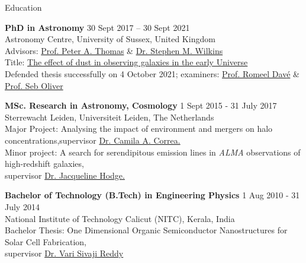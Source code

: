 \documentclass[a4paper,10pt]{resume} %
\begin{document}
\begin{rSection}{Education}

{\bf PhD in Astronomy} \hfill {30 Sept 2017 -- 30 Sept 2021}
\\ 
Astronomy Centre, University of Sussex, United Kingdom
\\
Advisors: \href{https://profiles.sussex.ac.uk/p2672-peter-thomas/about}{Prof. Peter A. Thomas} \& \href{http://stephenwilkins.co.uk/}{Dr. Stephen M. Wilkins}\\
Title: \href{https://sro.sussex.ac.uk/id/eprint/103266/}{The effect of dust in observing galaxies in the early Universe}\\
Defended thesis successfully on 4 October 2021; examiners: \href{https://romeeld.wixsite.com/romeel}{Prof. Romeel Dav{\'e}} \& \href{https://profiles.sussex.ac.uk/p91548-seb-oliver}{Prof. Seb Oliver}

{\bf MSc. Research in Astronomy, Cosmology} \hfill {1 Sept 2015 - 31 July 2017}
\\ 
Sterrewacht Leiden, Universiteit Leiden, The Netherlands\\
Major Project: Analysing the impact of environment and mergers on halo concentrations,\newline supervisor \href{https://camilacorrea.com/}{Dr. Camila A. Correa.}
\\
Minor project: A search for serendipitous emission lines in \textit{ALMA} observations of high-redshift galaxies, \\supervisor \href{https://home.strw.leidenuniv.nl/~hodge/}{Dr. Jacqueline Hodge.}

{\textbf{Bachelor of Technology (B.Tech) in Engineering Physics}}  \hfill{1 Aug 2010 - 31 July 2014}\\
National Institute of Technology Calicut (NITC), Kerala, India\\
Bachelor Thesis: One Dimensional Organic Semiconductor Nanostructures for Solar Cell Fabrication, \\supervisor  \href{http://nitc.ac.in/index.php/?url=users/view/223/13/3}{Dr. Vari Sivaji Reddy}


\end{rSection} 
\end{document}
